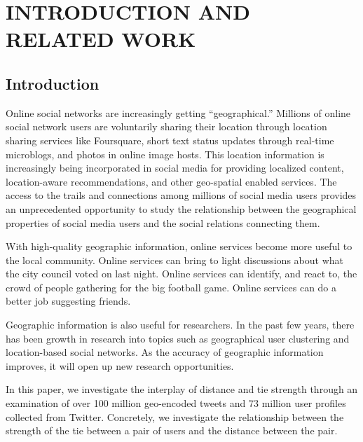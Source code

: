 \ifdefined\THESIS
    \pagestyle{plain} %
    \setcounter{page}{1}
    \chapter{\uppercase {Introduction and Related Work}}
\else
\fi

\section{Introduction}




Online social networks are increasingly getting ``geographical.''
%
Millions of online social network users are voluntarily sharing their location
through location sharing services like Foursquare, short text status updates
through real-time microblogs, and photos in online image hosts.
%
This location information is increasingly being incorporated in social media
for providing localized content, location-aware recommendations, and other
geo-spatial enabled services.
%
The access to the trails and connections among millions of social media users
provides an unprecedented opportunity to study the relationship between the
geographical properties of social media users and the social relations
connecting them.

With high-quality geographic information, online services become more useful to
the local community.
%
Online services can bring to light discussions about what the city council
voted on last night.
%
Online services can identify, and react to, the crowd of people gathering for
the big football game.
%
Online services can do a better job suggesting friends.
%

Geographic information is also useful for researchers.
%
In the past few years, there has been growth in research into topics such as
geographical user clustering and location-based social networks.
%
As the accuracy of geographic information improves, it will open up new
research opportunities.

In this paper, we investigate the interplay of distance and tie strength
through an examination of over 100 million geo-encoded tweets and 73 million
user profiles collected from Twitter.
%
Concretely, we investigate the relationship between the strength of the tie
between a pair of users and the distance between the pair.
%

